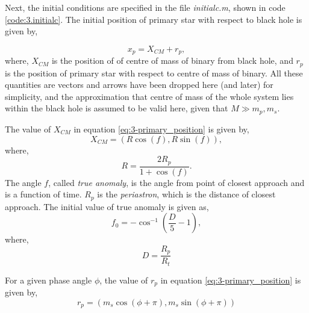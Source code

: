 \documentclass[a4paper]{article}
\begin{document}
\begin{enumerate} [label*=\textbf{(\alph*)}]
					\begin{figure}
						
					\end{figure}
					
					Next, the initial conditions are specified in the file \emph{initialc.m}, shown in code \ref{code:3.initialc}. The initial position of primary star with respect to black hole is given by,
					
					\begin{equation}
						x_p = X_{CM}^{} +r_p,
						\label{eq:3-primary_position}
					\end{equation}
					where, \(X_{CM}\) is the position of of centre of mass of binary from black hole, and \(r_p\) is the position of primary star with respect to centre of mass of binary. All these quantities are vectors and arrows have been dropped here (and later) for simplicity, and the approximation that centre of mass of the whole system lies within the black hole is assumed to be valid here, given that \(M \gg m_p,m_s\). 
					
					The value of \(X_{CM}^{}\) in equation \ref{eq:3-primary_position} is given by, 
					\begin{equation}
						X_{CM}^{} = (R \cos(f), R \sin(f)),
						\label{eq:3-xcm}
					\end{equation}
					where,
					\begin{equation}
						R = \frac{2 R_p}{1+ \cos(f)}.
						\label{eq:3-r}
					\end{equation}
					The angle \(f\), called \emph{true anomaly}, is the angle from point of closest approach and is a function of time. \(R_p\) is the \emph{periastron}, which is the distance of closest approach. The initial value of true anomaly is given as,
					\begin{equation}
						f_0 = - \cos^{-1} \left( \frac{D}{5} -1 \right),
						\label{eq:3-true_anomaly} 
					\end{equation}
					where, 
					\begin{equation}
						D = \frac{R_p}{R_t}
						\label{eq:3-d}
					\end{equation}
					
					For a given phase angle \(\phi\), the value of \(r_p\) in equation \ref{eq:3-primary_position} is given by,
					\begin{equation}
						r_p = (m_s \cos(\phi+\pi), m_s \sin (\phi+\pi))
						\label{eq:3-rp}
					\end{equation}
					

\end{enumerate}
\end{document}
